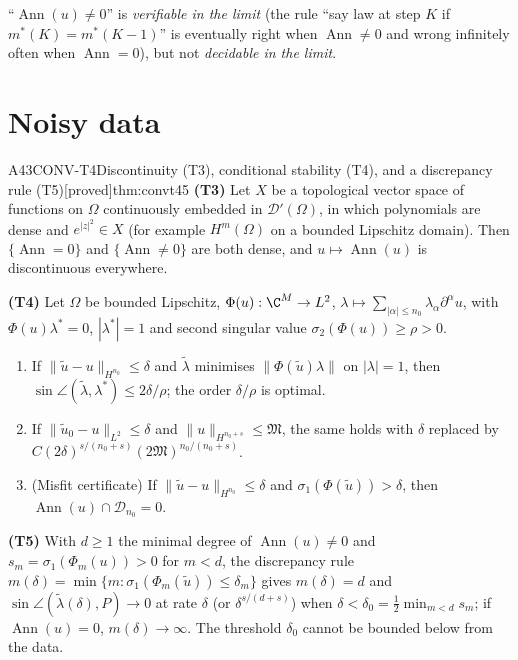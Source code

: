 \documentclass[11pt,a4paper,oneside]{report}
\newcommand{\badge}[2]{\textcolor{#1}{\textsf{\footnotesize[#2]}}}
\newcommand{\proved}{\badge{cC}{proved}}
\newcommand{\Ann}{\operatorname{Ann}}
\newenvironment{dimcard}[5]{\par\Needspace{12\baselineskip}\begin{dimcardbox}{#1}{#2}{#3}{#4}{#5}}{\end{dimcardbox}}
\begin{document}
\begin{caution}[title=Reading]
``$\Ann(u)\ne0$'' is \emph{verifiable in the limit} (the rule ``say law at step $K$ if $m^*(K)=m^*(K-1)$'' is eventually right when $\Ann\ne0$ and wrong infinitely often when $\Ann=0$), but not \emph{decidable in the limit}.
\end{caution}

\section{Noisy data}

\begin{dimcard}{A43}{CONV-T4}{Discontinuity (T3), conditional stability (T4), and a discrepancy rule (T5)}{\proved}{thm:convt45}
\textbf{(T3)} Let $X$ be a topological vector space of functions on $\Omega$ continuously embedded in $\mathcal D'(\Omega)$, in which polynomials are dense and $e^{|z|^2}\in X$ (for example $H^m(\Omega)$ on a bounded Lipschitz domain). Then $\{\Ann=0\}$ and $\{\Ann\ne0\}$ are both dense, and $u\mapsto\Ann(u)$ is discontinuous everywhere.

\textbf{(T4)} Let $\Omega$ be bounded Lipschitz, $\Phi(u):\C^M\to L^2$, $\lambda\mapsto\sum_{|\alpha|\le n_0}\lambda_\alpha\partial^\alpha u$, with $\Phi(u)\lambda^*=0$, $|\lambda^*|=1$ and second singular value $\sigma_2(\Phi(u))\ge\rho>0$.
\begin{enumerate}[label=(\alph*)]
\item If $\|\tilde u-u\|_{H^{n_0}}\le\delta$ and $\tilde\lambda$ minimises $\|\Phi(\tilde u)\lambda\|$ on $|\lambda|=1$, then $\sin\angle(\tilde\lambda,\lambda^*)\le2\delta/\rho$; the order $\delta/\rho$ is optimal.
\item If $\|\tilde u_0-u\|_{L^2}\le\delta$ and $\|u\|_{H^{n_0+s}}\le\mathfrak M$, the same holds with $\delta$ replaced by $C(2\delta)^{s/(n_0+s)}(2\mathfrak M)^{n_0/(n_0+s)}$.
\item (Misfit certificate) If $\|\tilde u-u\|_{H^{n_0}}\le\delta$ and $\sigma_1(\Phi(\tilde u))>\delta$, then $\Ann(u)\cap\mathcal D_{n_0}=0$.
\end{enumerate}

\textbf{(T5)} With $d\ge1$ the minimal degree of $\Ann(u)\ne0$ and $s_m=\sigma_1(\Phi_m(u))>0$ for $m<d$, the discrepancy rule $m(\delta)=\min\{m:\sigma_1(\Phi_m(\tilde u))\le\delta_m\}$ gives $m(\delta)=d$ and $\sin\angle(\tilde\lambda(\delta),P)\to0$ at rate $\delta$ (or $\delta^{s/(d+s)}$) when $\delta<\delta_0=\tfrac12\min_{m<d}s_m$; if $\Ann(u)=0$, $m(\delta)\to\infty$. The threshold $\delta_0$ cannot be bounded below from the data.
\end{dimcard}
\end{document}
